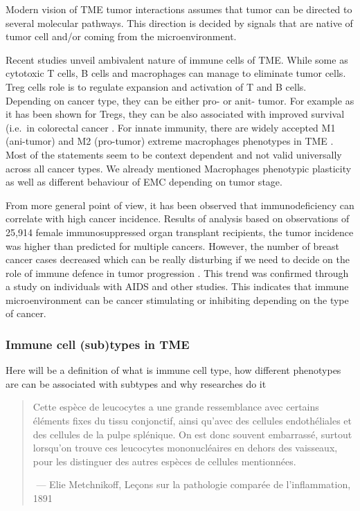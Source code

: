\documentclass[12pt,]{book}
\theoremstyle{definition}
\theoremstyle{definition}
\theoremstyle{definition}
\theoremstyle{remark}
\begin{document}
Modern vision of TME tumor interactions assumes that tumor can be
directed to several molecular pathways. This direction is decided by
signals that are native of tumor cell and/or coming from the
microenvironment.

Recent studies unveil ambivalent nature of immune cells of TME. While
some as cytotoxic T cells, B cells and macrophages can manage to
eliminate tumor cells. Treg cells role is to regulate expansion and
activation of T and B cells. Depending on cancer type, they can be
either pro- or anit- tumor. For example as it has been shown for Tregs,
they can be also associated with improved survival (i.e.~in colorectal
cancer \citep{Frey2010}. For innate immunity, there are widely accepted
M1 (ani-tumor) and M2 (pro-tumor) extreme macrophages phenotypes in TME
\citep{Qian2010}. Most of the statements seem to be context dependent
and not valid universally across all cancer types. We already mentioned
Macrophages phenotypic plasticity as well as different behaviour of EMC
depending on tumor stage.

From more general point of view, it has been observed that
immunodeficiency can correlate with high cancer incidence. Results of
analysis based on observations of 25,914 female immunosuppressed organ
transplant recipients, the tumor incidence was higher than predicted for
multiple cancers. However, the number of breast cancer cases decreased
which can be really disturbing if we need to decide on the role of
immune defence in tumor progression \citep{Stewart1995}. This trend was
confirmed through a study on individuals with AIDS and other studies.
This indicates that immune microenvironment can be cancer stimulating or
inhibiting depending on the type of cancer.

\hypertarget{immune-cell-subtypes-in-tme}{%
\subsubsection{Immune cell (sub)types in
TME}\label{immune-cell-subtypes-in-tme}}

Here will be a definition of what is immune cell type, how different
phenotypes are can be associated with subtypes and why researches do it

\begin{quote}
Cette espèce de leucocytes a une grande ressemblance avec certains
éléments fixes du tissu conjonctif, ainsi qu'avec des cellules
endothéliales et des cellules de la pulpe splénique. On est donc souvent
embarrassé, surtout lorsqu'on trouve ces leucocytes mononucléaires en
dehors des vaisseaux, pour les distinguer des autres espèces de cellules
mentionnées.

​ --- Elie Metchnikoff, Leçons sur la pathologie comparée de
l'inflammation, 1891
\end{quote}
\end{document}

